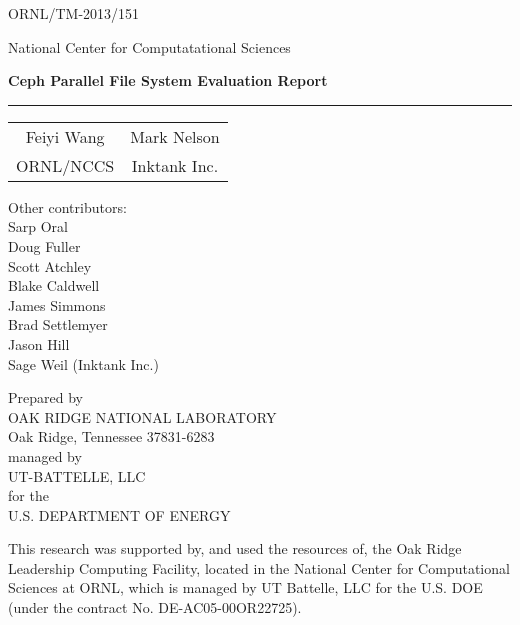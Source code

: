 \thispagestyle{empty}

\hfill ORNL/TM-2013/151


\vspace{3em}

\begin{center}
National Center for Computatational Sciences
\end{center}


\vspace{3em}

\begin{center}
\textbf{\Large Ceph Parallel File System Evaluation Report}\\
\rule{5in}{1pt}%
\end{center}

\vspace{0.5in}

\begin{center}
\begin{tabular}{ c c }
Feiyi Wang  &  Mark Nelson \\ 
ORNL/NCCS & Inktank Inc. \\
\end{tabular}
\end{center}

\vspace{0.25in}

\begin{center}
Other contributors: \\
\vspace{1em}
Sarp Oral\\
Doug Fuller\\
Scott Atchley\\
Blake Caldwell\\
James Simmons\\
Brad Settlemyer\\
Jason Hill\\
Sage Weil (Inktank Inc.)
\end{center}


\vfill

\begin{center}
Prepared by \\
OAK RIDGE NATIONAL LABORATORY\\
Oak Ridge, Tennessee 37831-6283 \\ 
managed by \\
UT-BATTELLE, LLC \\
for the \\
U.S. DEPARTMENT OF ENERGY\\ 
\end{center}

This research was supported by, and used the resources of, the Oak Ridge
Leadership Computing Facility, located in the National Center for
Computational Sciences at ORNL, which is managed by UT Battelle, LLC for the
U.S. DOE (under the contract No. DE-AC05-00OR22725).


\pagebreak
